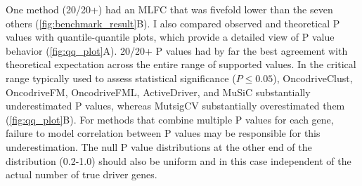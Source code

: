 One method (20/20+) had an MLFC that was fivefold lower than the seven others (\autoref{fig:benchmark_result}B). I also compared observed and theoretical P values with quantile-quantile plots, which provide a detailed view of P value behavior (\autoref{fig:qq_plot}A). 20/20+ P values had by far the best agreement with theoretical expectation across the entire range of supported values. In the critical range typically used to assess statistical significance ($P \leq 0.05$), OncodriveClust, OncodriveFM, OncodriveFML, ActiveDriver, and MuSiC substantially underestimated P values, whereas MutsigCV substantially overestimated them (\autoref{fig:qq_plot}B). For methods that combine multiple P values for each gene, failure to model correlation between P values may be responsible for this underestimation. The null P value distributions at the other end of the distribution (0.2-1.0) should also be uniform and in this case independent of the actual number of true driver genes.

